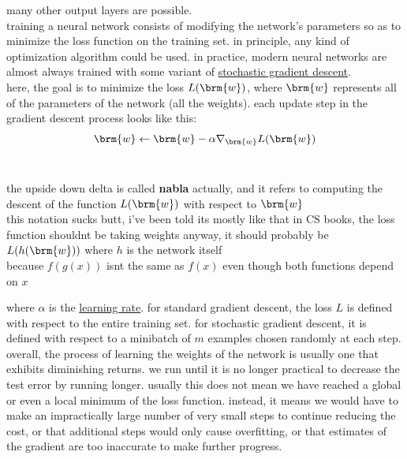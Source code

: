 \documentclass[a4paper,12pt]{article}
\begin{document}
many other output layers are possible.\\
training a neural network consists of modifying the network’s parameters so as to minimize the loss function on the training set. in principle, any kind of optimization algorithm could be used. in practice, modern neural networks are almost always trained with some variant of \href{20230503195522-stochastic_gradient_descent.org}{stochastic gradient descent}.\\
here, the goal is to minimize the loss \(L(\brm{w})\), where \(\brm{w}\) represents all of the parameters of the network (all the weights). each update step in the gradient descent process looks like this:\\
\[
\brm{w} \gets \brm{w} - \alpha\nabla_{\brm{w}}L(\brm{w})
\]\\
\begin{note}
the upside down delta is called \textbf{nabla} actually, and it refers to computing the descent of the function \(L(\brm{w})\) with respect to \(\brm{w}\)\\
this notation sucks butt, i've been told its mostly like that in CS books, the loss function shouldnt be taking weights anyway, it should probably be \(L(h(\brm{w}))\) where \(h\) is the network itself\\
because \(f(g(x))\) isnt the same as \(f(x)\) even though both functions depend on \(x\)\\
\end{note}
where \(\alpha\) is the \href{20230423002354-learning_rate.org}{learning rate}. for standard gradient descent, the loss \(L\) is defined with respect to the entire training set. for stochastic gradient descent, it is defined with respect to a minibatch of \(m\) examples chosen randomly at each step.\\
overall, the process of learning the weights of the network is usually one that exhibits diminishing returns. we run until it is no longer practical to decrease the test error by running longer. usually this does not mean we have reached a global or even a local minimum of the loss function. instead, it means we would have to make an impractically large number of very small steps to continue reducing the cost, or that additional steps would only cause overfitting, or that estimates of the gradient are too inaccurate to make further progress.\\
\end{document}
